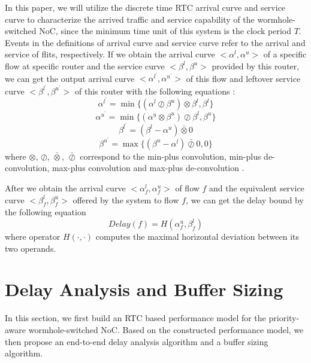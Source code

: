 \documentclass[preprint]{elsarticle}
\begin{document}
In this paper, we will utilize the discrete time RTC arrival curve and service curve to characterize the arrived traffic and service capability of the wormhole-switched NoC, since the minimum time unit of this system is the clock period $T$. Events in the definitions of arrival curve and service curve refer to the arrival and service of flits, respectively. If we obtain the arrival curve $<\alpha^l,\alpha^u>$ of a specific flow at specific router and the service curve $<\beta^l,\beta^u>$ provided by this router, we can get the output arrival curve $<\alpha^{l^\prime},\alpha^{u^\prime}>$ of this flow and leftover service curve $<\beta^{l^\prime},\beta^{u^\prime}>$ of this router with the following equations \cite{1253607}:
\begin{equation}\label{alphal}
\alpha^{l^\prime}=\min\{(\alpha^l\oslash\beta^u)\otimes\beta^l,\beta^l\}
\end{equation}
\begin{equation}\label{alphau}
\alpha^{u^\prime}=\min\{(\alpha^u\otimes\beta^u)\oslash\beta^l,\beta^u\}
\end{equation}
\begin{equation}\label{betal}
\beta^{l^\prime}=(\beta^l-\alpha^u)\bar{\otimes}0
\end{equation}
\begin{equation}\label{betau}
\beta^{u^\prime}=\max\{(\beta^u-\alpha^l)\bar{\oslash}0,0\}
\end{equation}
where $\otimes$, $\oslash$, $\bar{\otimes}$, $\bar{\oslash}$ correspond to the min-plus convolution, min-plus de-convolution, max-plus convolution and max-plus de-convolution \cite{Boudec2001Network}.

After we obtain the arrival curve $<\alpha^l_{f},\alpha^u_{f}>$ of flow $f$ and the equivalent service curve $<\beta_{f}^l,\beta_{f}^u>$ offered by the system to flow $f$, we can get the delay bound by the following equation \cite{Boudec2001Network}
\begin{equation}\label{delay}
Delay(f)=H(\alpha^u_{f},\beta^l_{f})
\end{equation}
where operator $H(\cdot,\cdot)$ computes the maximal horizontal deviation between its two operands.

\section{Delay Analysis and Buffer Sizing}\label{modeling}
In this section, we first build an RTC based performance model for the priority-aware wormhole-switched NoC. Based on the constructed performance model, we then propose an end-to-end delay analysis algorithm and a buffer sizing algorithm.
\end{document}
